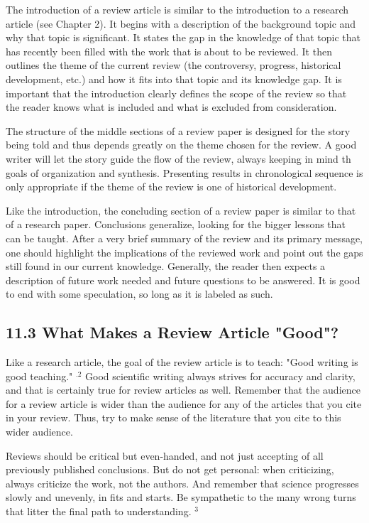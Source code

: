 The introduction of a review article is similar to the introduction to a research article (see Chapter 2). It begins with a description of the background topic and why that topic is significant. It states the gap in the knowledge of that topic that has recently been filled with the work that is about to be reviewed. It then outlines the theme of the current review (the controversy, progress, historical development, etc.) and how it fits into that topic and its knowledge gap. It is important that the introduction clearly defines the scope of the review so that the reader knows what is included and what is excluded from consideration.

The structure of the middle sections of a review paper is designed for the story being told and thus depends greatly on the theme chosen for the review. A good writer will let the story guide the flow of the review, always keeping in mind th goals of organization and synthesis. Presenting results in chronological sequence is only appropriate if the theme of the review is one of historical development.

Like the introduction, the concluding section of a review paper is similar to that of a research paper. Conclusions generalize, looking for the bigger lessons that can be taught. After a very brief summary of the review and its primary message, one should highlight the implications of the reviewed work and point out the gaps still found in our current knowledge. Generally, the reader then expects a description of future work needed and future questions to be answered. It is good to end with some speculation, so long as it is labeled as such.

\subsection*{11.3 What Makes a Review Article "Good"?}
Like a research article, the goal of the review article is to teach: "Good writing is good teaching." ${ }^{.2}$ Good scientific writing always strives for accuracy and clarity, and that is certainly true for review articles as well. Remember that the audience for a review article is wider than the audience for any of the articles that you cite in your review. Thus, try to make sense of the literature that you cite to this wider audience.

Reviews should be critical but even-handed, and not just accepting of all previously published conclusions. But do not get personal: when criticizing, always criticize the work, not the authors. And remember that science progresses slowly and unevenly, in fits and starts. Be sympathetic to the many wrong turns that litter the final path to understanding. ${ }^{3}$

